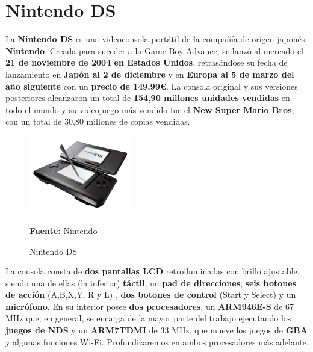 

\chapter{Nintendo DS} 

La \textbf{Nintendo DS} es una videoconsola portátil de la compañía de origen japonés; \textbf{Nintendo}. Creada para suceder a la Game Boy Advance, se lanzó al mercado el \textbf{21 de noviembre de 2004 en Estados Unidos}, retrasándose su fecha de lanzamiento en \textbf{Japón al 2 de diciembre} y en\textbf{ Europa al 5 de marzo del año siguiente} con un \textbf{precio de 149.99€}. La consola original y sus versiones posteriores alcanzaron un total de \textbf{154,90 millones unidades vendidas} en todo el mundo y su videojuego más vendido fue el \textbf{New Super Mario Bros}, con un total de 30,80 millones de copias vendidas.

\vspace{0.5cm}

\begin{figure}[htbp]
\centering
  \includegraphics[width=0.4\textwidth]{archivos/nds.jpg}
  \caption{Nintendo DS}
  \textbf{Fuente:} \href{https://www.nintendo.co.uk/Nintendo-DS/Nintendo-DS-Family-Nintendo-UK-s-official-site-Nintendo-DS-Nintendo-DSi-Nintendo-DSi-XL-116380.html}{Nintendo}
  \label{fig:nds1}
\end{figure}

\vspace{0.5cm}

La consola consta de \textbf{ dos pantallas LCD} retroiluminadas con brillo ajustable, siendo una de ellas (la inferior) \textbf{ táctil}, un  \textbf{pad de direcciones},  \textbf{seis botones de acción} (A,B,X,Y, R y L) , \textbf{dos botones de control} (Start y Select) y un \textbf{micrófono}. En su interior posee \textbf{dos procesadores}, un \textbf{ARM946E-S} de 67 MHz que, en general, se encarga de la mayor parte del trabajo ejecutando los \textbf{juegos de NDS} y un \textbf{ARM7TDMI} de 33 MHz, que mueve los juegos de \textbf{GBA} y algunas funciones Wi-Fi. Profundizaremos en ambos procesadores más adelante.

